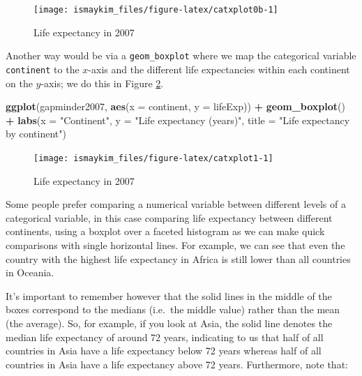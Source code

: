 \documentclass[12pt,]{krantz}
\makeatletter
\newenvironment{Shaded}{\begin{snugshade}}{\end{snugshade}}
\newcommand{\KeywordTok}[1]{\textcolor[rgb]{0.27,0.27,0.27}{\textbf{#1}}}
\newcommand{\DataTypeTok}[1]{\textcolor[rgb]{0.27,0.27,0.27}{#1}}
\newcommand{\StringTok}[1]{\textcolor[rgb]{0.5,0.5,0.5}{#1}}
\newcommand{\OperatorTok}[1]{\textcolor[rgb]{0.43,0.43,0.43}{\textbf{#1}}}
\newcommand{\NormalTok}[1]{#1}
\newenvironment{kframe}{%
\medskip{}
\setlength{\fboxsep}{.8em}
 \def\at@end@of@kframe{}%
 \ifinner\ifhmode%
  \def\at@end@of@kframe{\end{minipage}}%
  \begin{minipage}{\columnwidth}%
 \fi\fi%
 \def\FrameCommand##1{\hskip\@totalleftmargin \hskip-\fboxsep
 \colorbox{shadecolor}{##1}\hskip-\fboxsep
     \hskip-\linewidth \hskip-\@totalleftmargin \hskip\columnwidth}%
 \MakeFramed {\advance\hsize-\width
   \@totalleftmargin\z@ \linewidth\hsize
   \@setminipage}}%
 {\par\unskip\endMakeFramed%
 \at@end@of@kframe}
\renewenvironment{Shaded}{\begin{kframe}}{\end{kframe}}
\theoremstyle{definition}
\theoremstyle{definition}
\theoremstyle{definition}
\theoremstyle{remark}
\makeatother
\begin{document}
\begin{figure}

{\centering \texttt{[image: ismaykim\_files/figure-latex/catxplot0b-1]} 

}

\caption{Life expectancy in 2007}\label{fig:catxplot0b}
\end{figure}

Another way would be via a \texttt{geom\_boxplot} where we map the
categorical variable \texttt{continent} to the \(x\)-axis and the
different life expectancies within each continent on the \(y\)-axis; we
do this in Figure \ref{fig:catxplot1}.

\begin{Shaded}
\begin{Highlighting}[]
\KeywordTok{ggplot}\NormalTok{(gapminder2007, }\KeywordTok{aes}\NormalTok{(}\DataTypeTok{x =}\NormalTok{ continent, }\DataTypeTok{y =}\NormalTok{ lifeExp)) }\OperatorTok{+}
\StringTok{  }\KeywordTok{geom_boxplot}\NormalTok{() }\OperatorTok{+}
\StringTok{  }\KeywordTok{labs}\NormalTok{(}\DataTypeTok{x =} \StringTok{"Continent"}\NormalTok{, }\DataTypeTok{y =} \StringTok{"Life expectancy (years)"}\NormalTok{, }
       \DataTypeTok{title =} \StringTok{"Life expectancy by continent"}\NormalTok{) }
\end{Highlighting}
\end{Shaded}

\begin{figure}

{\centering \texttt{[image: ismaykim\_files/figure-latex/catxplot1-1]} 

}

\caption{Life expectancy in 2007}\label{fig:catxplot1}
\end{figure}

Some people prefer comparing a numerical variable between different
levels of a categorical variable, in this case comparing life expectancy
between different continents, using a boxplot over a faceted histogram
as we can make quick comparisons with single horizontal lines. For
example, we can see that even the country with the highest life
expectancy in Africa is still lower than all countries in Oceania.

It's important to remember however that the solid lines in the middle of
the boxes correspond to the medians (i.e.~the middle value) rather than
the mean (the average). So, for example, if you look at Asia, the solid
line denotes the median life expectancy of around 72 years, indicating
to us that half of all countries in Asia have a life expectancy below 72
years whereas half of all countries in Asia have a life expectancy above
72 years. Furthermore, note that:
\end{document}
